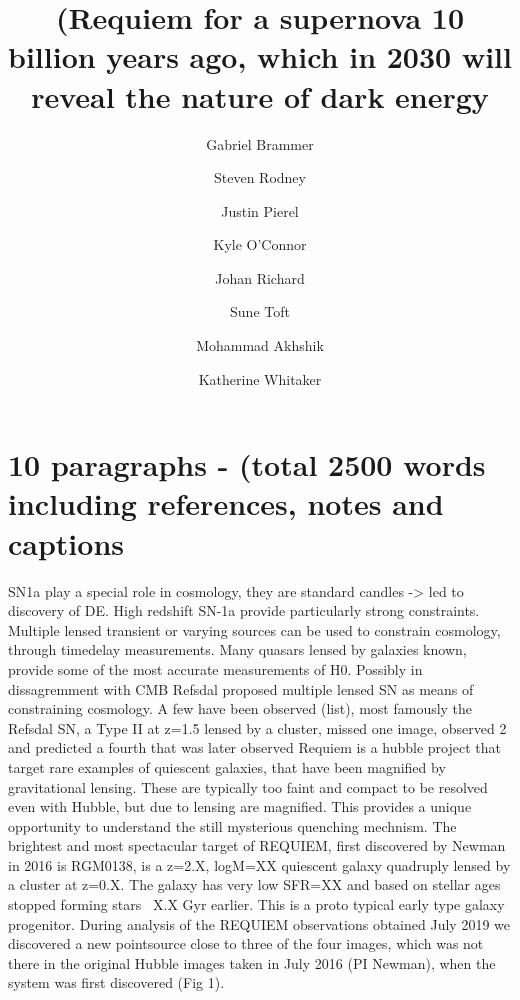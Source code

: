 \documentclass[fleqn,10pt]{wlscirep}
\title{(Requiem for a supernova 10 billion years ago, which in 2030 will reveal the nature of dark energy}
\author[1,2,*]{Gabriel Brammer}
\author[3]{Steven Rodney}
\author[4]{Justin Pierel}
\author[4]{Kyle O'Connor}
\author[4]{Johan Richard}
\author[1,2]{Sune Toft}
\author[5]{Mohammad Akhshik}
\author[6,1]{Katherine Whitaker}
\affil[1]{Cosmic Dawn Center (DAWN)}
\affil[2]{ Niels Bohr Institute, University of Copenhagen, Denmark}
\affil[3]{University of South Carolina}
\affil[5]{Universit\'e Claude Bernard Lyon}
\affil[6]{University of Connecticut}
\affil[6]{University of Massachusetts, Amherst}
\affil[*]{gabriel.brammer@nbi.ku.dk}
\begin{document}
\listoftodos


\flushbottom
\maketitle

%
%


\section*{10 paragraphs - (total 2500 words including references, notes and captions}
 SN1a play a special role in cosmology, they are standard candles -> led to discovery of DE. High redshift SN-1a provide particularly strong constraints.
\newline
\newline
Multiple lensed transient or varying sources can be used to constrain cosmology, through timedelay measurements.  Many quasars lensed by galaxies known, provide some of the most accurate measurements of H0.  Possibly in dissagremment with CMB 
\newline
\newline
Refsdal proposed multiple lensed SN as means of constraining cosmology. A few have been observed (list), most famously the Refsdal SN, a Type II at z=1.5 lensed by a cluster, missed one image, observed 2 and predicted a fourth that was later observed
\newline
\newline
Requiem is a hubble project that target rare examples of quiescent galaxies, that have been magnified by gravitational lensing. These are typically too faint and compact to be resolved even with Hubble, but due to lensing are magnified. This provides a unique opportunity to  understand the still mysterious quenching mechnism. 
The brightest and most spectacular target of REQUIEM, first discovered by Newman in 2016 is RGM0138, is a z=2.X, logM=XX quiescent galaxy quadruply lensed by a cluster at z=0.X. The galaxy has very low SFR=XX and based on stellar ages stopped forming stars ~X.X Gyr earlier. This is a proto typical early type galaxy progenitor.
\newline
\newline
During analysis of the REQUIEM observations obtained  July 2019 we discovered a new pointsource close to three of the four images, which was not there in the original Hubble images taken in July 2016 (PI Newman), when the system was first discovered (Fig 1). 
\newline
\newline
\end{document}
